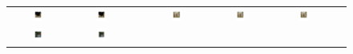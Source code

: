 \documentclass{article} %
\begin{document}
\begin{figure}[t]
\begin{minipage}{\textwidth}
{\begin{tabular}{ccccccc}
\includegraphics[width=0.17\textwidth]{figures/cow_1_sift} &
\includegraphics[width=0.17\textwidth]{figures/cow_1_conv} & &
\includegraphics[width=0.17\textwidth]{figures/cow_2_gt} &
\includegraphics[width=0.17\textwidth]{figures/cow_2_sift} &
\includegraphics[width=0.17\textwidth]{figures/cow_2_conv} \\
\includegraphics[width=0.17\textwidth]{figures/pot_1_gt} &
\includegraphics[width=0.17\textwidth]{figures/pot_1_sift} &

\end{tabular}}
\end{minipage}
\end{figure}
\end{document}
